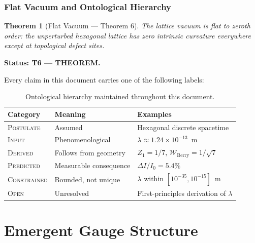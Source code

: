 \documentclass[11pt,letterpaper]{article}
\newtheorem{theorem}{Theorem}[section]
\begin{document}
\section{Flat Vacuum and Ontological Hierarchy}

\begin{theorem}[Flat Vacuum --- Theorem 6]\label{thm:T6}
The lattice vacuum is flat to zeroth order: the unperturbed hexagonal lattice
has zero intrinsic curvature everywhere except at topological defect sites.
\end{theorem}

\textbf{Status: T6 --- THEOREM.}

\medskip
\noindent
Every claim in this document carries one of the following labels:

\begin{table}[h]
\centering
\begin{tabular}{lll}
\toprule
\textbf{Category} & \textbf{Meaning} & \textbf{Examples} \\
\midrule
\textsc{Postulate}   & Assumed         & Hexagonal discrete spacetime \\
\textsc{Input}       & Phenomenological & $\lambda\approx1.24\times10^{-13}$~m \\
\textsc{Derived}     & Follows from geometry & $Z_1=1/7$, $\mathcal{W}_\mathrm{Berry}=1/\sqrt{7}$ \\
\textsc{Predicted}   & Measurable consequence & $\Delta I/I_0=5.4\%$ \\
\textsc{Constrained} & Bounded, not unique & $\lambda$ within $[10^{-35},10^{-15}]$~m \\
\textsc{Open}        & Unresolved & First-principles derivation of $\lambda$ \\
\bottomrule
\end{tabular}
\caption{Ontological hierarchy maintained throughout this document.}
\end{table}

%
%
\newpage
\part{Emergent Gauge Structure}
\end{document}

